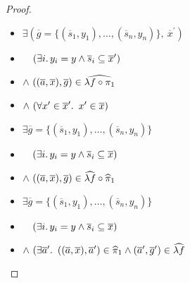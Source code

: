 \begin{prop}
\begin{proof}
\begin{itemize}
      \item[\iffs]
        $\exists(\overline{g} = \{(\overline{s}_1,y_1),\ldots,(\overline{s}_n,y_n)\},~\overline{x}^\prime)$

      \addtolength{\itemsep}{-.3\baselineskip}
      \item[\phantom{\imps}]
        \quad$\phantom{\land}~(\exists i\ldotp y_i=y\land\overline{s}_i\subseteq\overline{x}^\prime)$

      \item[\phantom{\imps}]
        \quad$\land~((\overline{a},\overline{x}), \overline{g})\in\widehat{\lambda f\circ\pi_1}$
        \marginnote{\Def-$~\widehat{\cdot}$}

      \item[\phantom{\imps}]
        \quad$\land~(\forall x^\prime\in\overline{x}^\prime\ldotp~x^\prime\in\overline{x})$
      \addtolength{\itemsep}{.3\baselineskip}

      \item[\iffs]
        $\exists\overline{g} = \{(\overline{s}_1,y_1),\ldots,(\overline{s}_n,y_n)\}$

      \addtolength{\itemsep}{-.3\baselineskip}
      \item[\phantom{\imps}]
        \quad$\phantom{\land}~(\exists i\ldotp y_i=y\land\overline{s}_i\subseteq\overline{x})$

      \item[\phantom{\imps}]
        \quad$\land~((\overline{a},\overline{x}), \overline{g})\in\widehat{\lambda f}\circ\widehat{\pi}_1$
        \marginnote{\Thm-\ref{prop:rel-hat-comp}}

      \addtolength{\itemsep}{.3\baselineskip}

      \item[\iffs]
        $\exists\overline{g} = \{(\overline{s}_1,y_1),\ldots,(\overline{s}_n,y_n)\}$

      \addtolength{\itemsep}{-.3\baselineskip}
      \item[\phantom{\imps}]
        \quad$\phantom{\land}~(\exists i\ldotp y_i=y\land\overline{s}_i\subseteq\overline{x})$

      \item[\phantom{\imps}]
        \quad$\land~(\exists\overline{a}^\prime\ldotp~((\overline{a},\overline{x}),\overline{a}^\prime)\in\widehat{\pi}_1\land(\overline{a}^\prime,\overline{g}^\prime)\in\widehat{\lambda f}$

      \addtolength{\itemsep}{.3\baselineskip}


\end{itemize}
\end{proof}
\end{prop}
